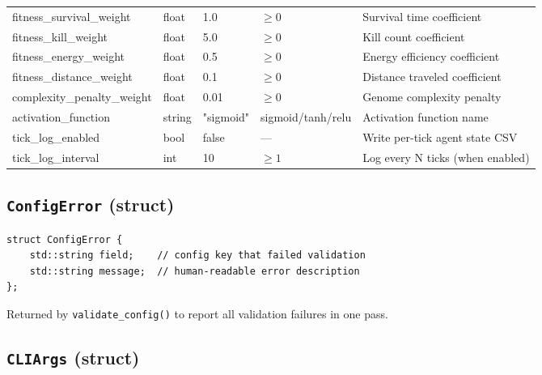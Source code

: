 \begin{longtable}[l]{@{}>{\ttfamily\small}p{3.2cm}>{\ttfamily\small}p{1.8cm}p{1.2cm}p{2cm}p{4.8cm}@{}}
fitness\_survival\_weight  & float & 1.0 & $\ge 0$  & Survival time coefficient \\
fitness\_kill\_weight      & float & 5.0 & $\ge 0$  & Kill count coefficient \\
fitness\_energy\_weight    & float & 0.5 & $\ge 0$  & Energy efficiency coefficient \\
fitness\_distance\_weight  & float & 0.1 & $\ge 0$  & Distance traveled coefficient \\
complexity\_penalty\_weight& float & 0.01& $\ge 0$  & Genome complexity penalty \\
activation\_function   & string & "sigmoid" & sigmoid/tanh/relu & Activation function name \\
tick\_log\_enabled     & bool   & false  & —             & Write per-tick agent state CSV \\
tick\_log\_interval    & int    & 10     & $\ge 1$       & Log every N ticks (when enabled) \\
\end{longtable}

\subsection{\texttt{ConfigError} (struct)}

\begin{lstlisting}
struct ConfigError {
    std::string field;    // config key that failed validation
    std::string message;  // human-readable error description
};
\end{lstlisting}

Returned by \texttt{validate\_config()} to report all validation failures in one pass.

\subsection{\texttt{CLIArgs} (struct)}

